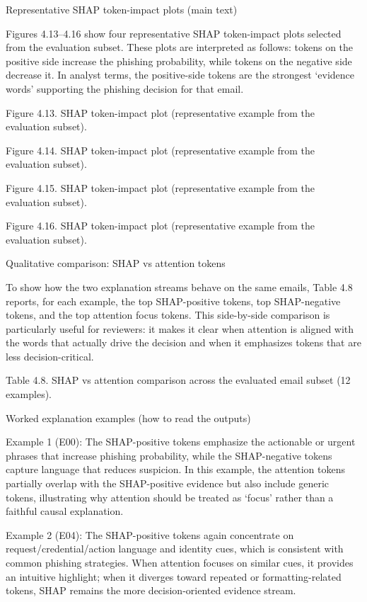 \documentclass[conference]{IEEEtran}
\begin{document}
Representative SHAP token-impact plots (main text)

Figures 4.13--4.16 show four representative SHAP token-impact plots selected from the evaluation subset. These plots are interpreted as follows: tokens on the positive side increase the phishing probability, while tokens on the negative side decrease it. In analyst terms, the positive-side tokens are the strongest ‘evidence words’ supporting the phishing decision for that email.

Figure 4.13. SHAP token-impact plot (representative example from the evaluation subset).

Figure 4.14. SHAP token-impact plot (representative example from the evaluation subset).

Figure 4.15. SHAP token-impact plot (representative example from the evaluation subset).

Figure 4.16. SHAP token-impact plot (representative example from the evaluation subset).

Qualitative comparison: SHAP vs attention tokens

To show how the two explanation streams behave on the same emails, Table 4.8 reports, for each example, the top SHAP-positive tokens, top SHAP-negative tokens, and the top attention focus tokens. This side-by-side comparison is particularly useful for reviewers: it makes it clear when attention is aligned with the words that actually drive the decision and when it emphasizes tokens that are less decision-critical.

Table 4.8. SHAP vs attention comparison across the evaluated email subset (12 examples).

Worked explanation examples (how to read the outputs)

Example 1 (E00): The SHAP-positive tokens emphasize the actionable or urgent phrases that increase phishing probability, while the SHAP-negative tokens capture language that reduces suspicion. In this example, the attention tokens partially overlap with the SHAP-positive evidence but also include generic tokens, illustrating why attention should be treated as ‘focus’ rather than a faithful causal explanation.

Example 2 (E04): The SHAP-positive tokens again concentrate on request/credential/action language and identity cues, which is consistent with common phishing strategies. When attention focuses on similar cues, it provides an intuitive highlight; when it diverges toward repeated or formatting-related tokens, SHAP remains the more decision-oriented evidence stream.
\end{document}
